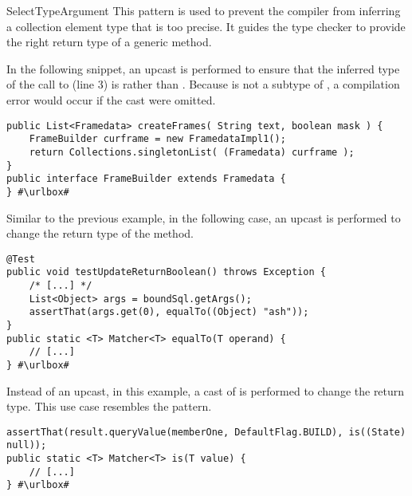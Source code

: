 \begin{pattern}{SelectTypeArgument}
This pattern is used to prevent the compiler
from inferring a collection element type that is too precise.
It guides the type checker to provide the right return type of a generic method.


\instances{}
In the following snippet, an upcast is performed to ensure that the
inferred type of the call to  (line 3)
is  rather than .
Because  is not a subtype of ,
a compilation error would occur if the cast were omitted.

\def\urlvar{http://bit.ly/arpruss_raspberryjammod_2USL7Ai}
\begin{verbatim}
public List<Framedata> createFrames( String text, boolean mask ) {
    FrameBuilder curframe = new FramedataImpl1();
    return Collections.singletonList( (Framedata) curframe );
}
public interface FrameBuilder extends Framedata {
} #\urlbox#
\end{verbatim}

Similar to the previous example, in the following case,
an upcast is performed to change the return type of the
 method.

\def\urlvar{http://bit.ly/jfaster_mango_2EhXzUW}
\begin{verbatim}
@Test
public void testUpdateReturnBoolean() throws Exception {
    /* [...] */
    List<Object> args = boundSql.getArgs();
    assertThat(args.get(0), equalTo((Object) "ash"));
}
public static <T> Matcher<T> equalTo(T operand) {
    // [...]
} #\urlbox#
\end{verbatim}

Instead of an upcast, in this example,
a cast of  is performed to change the return type.
This use case resembles the  pattern.

\def\urlvar{http://bit.ly/EngineHub_WorldGuard_2IVUOx1}
\begin{verbatim}
assertThat(result.queryValue(memberOne, DefaultFlag.BUILD), is((State) null));
public static <T> Matcher<T> is(T value) {
    // [...]
} #\urlbox#
\end{verbatim}


\end{pattern}
